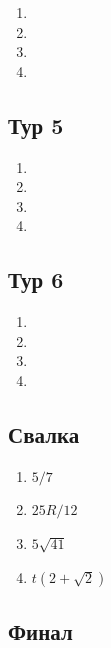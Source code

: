 \documentclass[12pt]{article} %
\begin{document}
\begin{enumerate}
\item 
\item 
\item 
\item 
\end{enumerate}

\subsection*{Тур 5}

\begin{enumerate}
\item 
\item 
\item 
\item 
\end{enumerate}

\subsection*{Тур 6}

\begin{enumerate}
\item 
\item 
\item 
\item 
\end{enumerate}


\subsection*{Свалка}

\begin{enumerate}
\item $5/7$
\item $25R/12$ 
\item $5\sqrt{41}$ 
\item $t(2 + \sqrt 2)$
\end{enumerate}
    
\subsection*{Финал}
\end{document}
